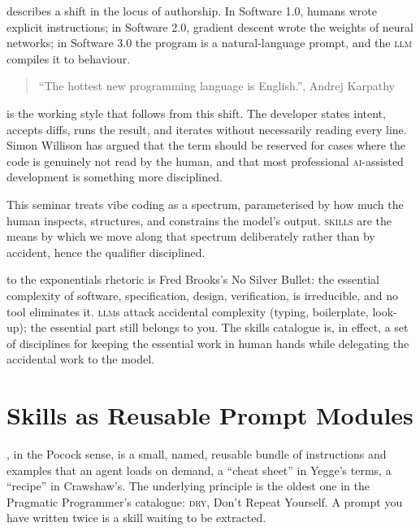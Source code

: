 \documentclass{../sharedAssets/tufte}
\begin{document}
 describes a shift in the locus of authorship.
In Software 1.0, humans wrote explicit instructions; in Software
2.0, gradient descent wrote the weights of neural networks; in Software
3.0 the program is a natural-language
prompt, and the \textsc{llm} compiles it to behaviour.

\begin{quote}
``The hottest new programming language is English.'', Andrej Karpathy
\end{quote}

 is the working style that follows from this shift.
The developer states intent, accepts diffs, runs the result, and iterates
without necessarily reading every line. Simon Willison has argued that the
term should be reserved for cases where the code is genuinely not read
by the human, and that most professional \textsc{ai}-assisted development
is something more disciplined.\cite{willison2025notvibe}

This seminar treats vibe coding as a spectrum, parameterised by
how much the human inspects, structures, and constrains the model's
output. \textsc{skills} are the means by which we move along that
spectrum deliberately rather than by accident, hence the qualifier
disciplined.

 to the exponentials rhetoric is
Fred Brooks's No Silver Bullet\cite{brooks1987silver}: the
essential complexity of software, specification, design,
verification, is irreducible, and no tool eliminates it. \textsc{llm}s
attack accidental complexity (typing, boilerplate, look-up); the
essential part still belongs to you. The skills catalogue is, in
effect, a set of disciplines for keeping the essential work in human
hands while delegating the accidental work to the model.

\section{Skills as Reusable Prompt Modules}
\label{sec:skills-concept}

, in the Pocock sense, is a small, named, reusable
bundle of instructions and examples that an agent loads on demand, a
``cheat sheet'' in Yegge's terms\cite{yegge2024cheating}, a ``recipe''
in Crawshaw's.\cite{crawshaw2024sketch}
The underlying principle is the oldest one in the Pragmatic Programmer's
catalogue\cite{hunt1999pragmatic}: \textsc{dry}, Don't Repeat
Yourself. A prompt you have written twice is a skill waiting to be
extracted.
\end{document}
